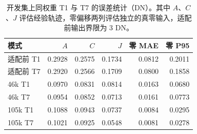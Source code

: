 \begin{table}[!t]
\centering
\caption{开发集上同权重 T1 与 T7 的误差统计（DN）。其中 $A$、$C$、$J$ 评估经验轨迹，零偏移两列评估独立的真零输入，适配前输出界限为 3 DN。}\label{tab:metrics}
\footnotesize
\setlength{\tabcolsep}{2pt}
\begin{tabular}{lrrrrr}
\toprule
模式 & $A$ & $C$ & $J$ & 零 MAE & 零 P95 \\
\midrule
适配前 T1 & 0.2928 & 0.2575 & 0.1734 & 0.0812 & 0.2011 \\
适配前 T7 & 0.2920 & 0.2566 & 0.1709 & 0.0800 & 0.1858 \\
46k T1 & 0.0970 & 0.0831 & 0.0814 & 0.0163 & 0.0680 \\
46k T7 & 0.0954 & 0.0852 & 0.0713 & 0.0161 & 0.0773 \\
105k T1 & 0.1088 & 0.0943 & 0.0737 & 0.0084 & 0.0295 \\
105k T7 & 0.1021 & 0.0925 & 0.0548 & 0.0081 & 0.0278 \\
\bottomrule
\end{tabular}
\end{table}
